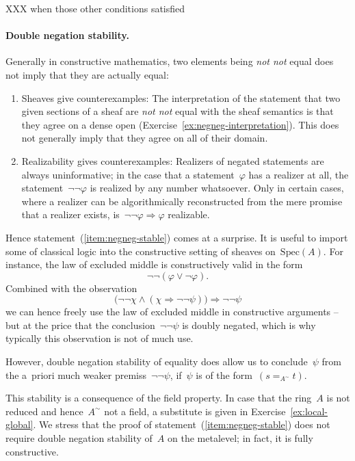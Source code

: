 \documentclass{ws-rv9x6}
\newcommand{\Spec}{\mathrm{Spec}}
\renewcommand{\_}{\mathpunct{.}}
\newcommand{\?}{\,{:}\,}
\newcommand{\notnot}{\emph{not not}\xspace}
\begin{document}
XXX when those other conditions satisfied

\paragraph{Double negation stability.} Generally in constructive mathematics,
two elements being \notnot equal does not imply that they are actually equal:
\begin{enumerate}
\item Sheaves give counterexamples: The interpretation of the statement that
two given sections of a sheaf are \notnot equal with the sheaf semantics is
that they agree on a dense open (Exercise~\ref{ex:negneg-interpretation}). This
does not generally imply that they agree on all of their domain.
\item Realizability gives counterexamples: Realizers of negated statements are
always uninformative; in the case that a statement~$\varphi$ has a realizer at
all, the statement~$\neg\neg\varphi$ is realized by any number whatsoever.
Only in certain cases, where a realizer can be algorithmically reconstructed
from the mere promise that a realizer exists, is~$\neg\neg\varphi \Rightarrow
\varphi$ realizable.
\end{enumerate}

Hence statement~(\ref{item:negneg-stable}) comes at a surprise. It is useful to
import some of classical logic into the constructive setting of sheaves
on~$\Spec(A)$. For instance, the law of excluded middle is constructively valid
in the form
\[ \neg\neg(\varphi \vee \neg\varphi). \]
Combined with the observation
\[ \bigl(\neg\neg\chi \wedge (\chi \Rightarrow \neg\neg\psi)\bigr) \Longrightarrow \neg\neg\psi \]
we can hence freely use the law of excluded middle in constructive arguments --
but at the price that the conclusion~$\neg\neg\psi$ is doubly negated, which is
why typically this observation is not of much use.

However, double negation stability of equality does allow us to conclude~$\psi$
from the a~priori much weaker premiss~$\neg\neg\psi$, if~$\psi$ is of the
form~$(s =_{A^\sim} t)$.

This stability is a consequence of the field property. In case that the
ring~$A$ is not reduced and hence~$A^\sim$ not a field, a substitute is given
in Exercise~\ref{ex:local-global}. We stress that the proof of
statement~(\ref{item:negneg-stable}) does not require double negation stability
of~$A$ on the metalevel; in fact, it is fully constructive.
\end{document}
